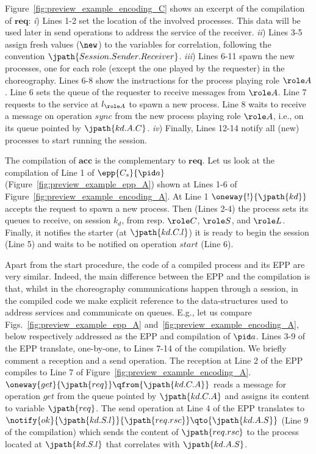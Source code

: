 Figure~\ref{fig:preview_example_encoding_C} shows an excerpt of the compilation
of $\textbf{req}$: \emph{i}) Lines 1-2 set the location of the involved
processes. This data will be used later in send operations to address the
service of the receiver. \emph{ii}) Lines 3-5 assign fresh values ($\new$) to
the variables for correlation, following the convention
$\jpath{Session.Sender.Receiver}$. \emph{iii}) Lines 6-11 spawn the new
processes, one for each role (except the one played by the requester) in the
choreography. Lines 6-8 show the instructions for the process playing role
$\role A$. Line 6 sets the queue of the requester to receive messages from
$\role A$. Line 7 requests to the service at $l_{\role A}$ to spawn a new
process. Line 8 waits to receive a message on operation $sync$ from the new
process playing role $\role A$, i.e., on its queue pointed by
$\jpath{kd.A.C}$. \emph{iv}) Finally, Lines 12-14 notify all (new) processes
to start running the session.

The compilation of $\textbf{acc}$ is the complementary to
$\textbf{req}$. Let us look at the compilation of Line 1 of $\epp{C_s}{\pid
a}$ (Figure~\ref{fig:preview_example_epp_A}) shown at Lines 1-6 of
Figure~\ref{fig:preview_example_encoding_A}. At Line 1 $\oneway{!}{\jpath{kd}}$
accepts the request to spawn a new process. Then (Lines 2-4) the process sets
its queues to receive, on session $k_d$, from resp. $\role C$, $\role S$, and
$\role L$. Finally, it notifies the starter (at $\jpath{kd.C.l}$) it is
ready to begin the session (Line 5) and waits to be notified on operation
$start$ (Line 6).

Apart from the start procedure, the code of a compiled process and its EPP
are very similar. Indeed, the main difference between the EPP and the
compilation is that, whilst in the choreography communications happen through
a session, in the compiled code we make explicit reference to the
data-structures used to address services and communicate on queues. E.g., let
us compare Figs.~\ref{fig:preview_example_epp_A}
and~\ref{fig:preview_example_encoding_A}, below respectively addressed as the
EPP and compilation of $\pid a$. Lines 3-9 of the EPP translate, one-by-one,
to Lines 7-14 of the compilation. We briefly comment a reception and a send
operation. The reception at Line 2 of the EPP compiles to Line 7 of
Figure~\ref{fig:preview_example_encoding_A}. $\oneway{get}{\jpath{req}}
\qfrom{\jpath{kd.C.A}}$ reads a message for operation $get$
from the queue pointed by $\jpath{kd.C.A}$ and assigns its content to
variable $\jpath{req}$. The send operation at Line 4 of the EPP translates to
$\notify{ok}{\jpath{kd.S.l}}{\jpath{req.rsc}} \qto{\jpath{kd.A.S}}$ (Line 9
of the compilation) which sends the content of $\jpath{req.rsc}$ to the
process located at $\jpath{kd.S.l}$ that correlates with $\jpath{kd.A.S}$.



